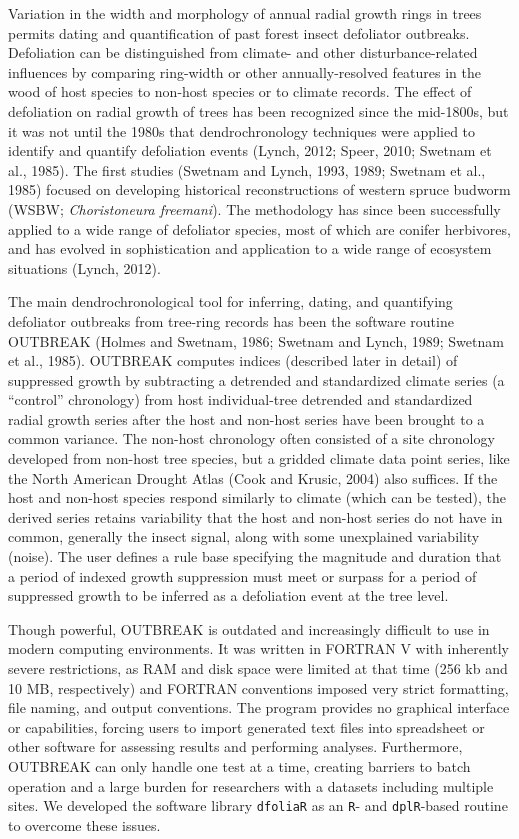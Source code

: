 \documentclass[review]{elsarticle} %
\begin{document}
Variation in the width and morphology of annual radial growth rings in trees permits dating and quantification of past forest insect defoliator outbreaks. Defoliation can be distinguished from climate- and other disturbance-related influences by comparing ring-width or other annually-resolved features in the wood of host species to non-host species or to climate records. The effect of defoliation on radial growth of trees has been recognized since the mid-1800s, but it was not until the 1980s that dendrochronology techniques were applied to identify and quantify defoliation events (Lynch, 2012; Speer, 2010; Swetnam et al., 1985). The first studies (Swetnam and Lynch, 1993, 1989; Swetnam et al., 1985) focused on developing historical reconstructions of western spruce budworm (WSBW; \emph{Choristoneura freemani}). The methodology has since been successfully applied to a wide range of defoliator species, most of which are conifer herbivores, and has evolved in sophistication and application to a wide range of ecosystem situations (Lynch, 2012).

The main dendrochronological tool for inferring, dating, and quantifying defoliator outbreaks from tree-ring records has been the software routine OUTBREAK (Holmes and Swetnam, 1986; Swetnam and Lynch, 1989; Swetnam et al., 1985). OUTBREAK computes indices (described later in detail) of suppressed growth by subtracting a detrended and standardized climate series (a ``control'' chronology) from host individual-tree detrended and standardized radial growth series after the host and non-host series have been brought to a common variance. The non-host chronology often consisted of a site chronology developed from non-host tree species, but a gridded climate data point series, like the North American Drought Atlas (Cook and Krusic, 2004) also suffices. If the host and non-host species respond similarly to climate (which can be tested), the derived series retains variability that the host and non-host series do not have in common, generally the insect signal, along with some unexplained variability (noise). The user defines a rule base specifying the magnitude and duration that a period of indexed growth suppression must meet or surpass for a period of suppressed growth to be inferred as a defoliation event at the tree level.

Though powerful, OUTBREAK is outdated and increasingly difficult to use in modern computing environments. It was written in FORTRAN V with inherently severe restrictions, as RAM and disk space were limited at that time (256 kb and 10 MB, respectively) and FORTRAN conventions imposed very strict formatting, file naming, and output conventions. The program provides no graphical interface or capabilities, forcing users to import generated text files into spreadsheet or other software for assessing results and performing analyses. Furthermore, OUTBREAK can only handle one test at a time, creating barriers to batch operation and a large burden for researchers with a datasets including multiple sites. We developed the software library \texttt{dfoliaR} as an \texttt{R}- and \texttt{dplR}-based routine to overcome these issues.
\end{document}
